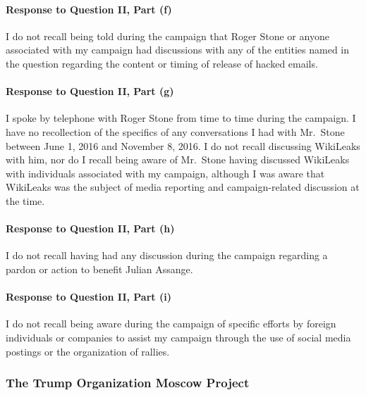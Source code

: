\paragraph*{Response to Question II, Part (f)}

I do not recall being told during the campaign that Roger Stone or anyone associated with my campaign had discussions with any of the entities named in the question regarding the content or timing of release of hacked emails.

\paragraph*{Response to Question II, Part (g)}

I spoke by telephone with Roger Stone from time to time during the campaign.
I have no recollection of the specifics of any conversations I had with Mr.~Stone between June 1, 2016 and November 8, 2016.
I do not recall discussing WikiLeaks with him, nor do I recall being aware of Mr.~Stone having discussed WikiLeaks with individuals associated with my campaign, although I was aware that WikiLeaks was the subject of media reporting and campaign-related discussion at the time.

\paragraph*{Response to Question II, Part (h)}

I do not recall having had any discussion during the campaign regarding a pardon or action to benefit Julian Assange.

\paragraph*{Response to Question II, Part (i)}

I do not recall being aware during the campaign of specific efforts by foreign individuals or companies to assist my campaign through the use of social media postings or the organization of rallies.

\subsubsection{The Trump Organization Moscow Project}

